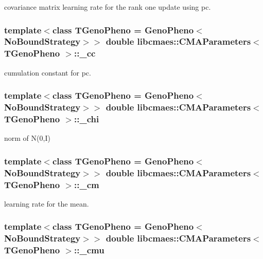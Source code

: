 covariance matrix learning rate for the rank one update using pc. \hypertarget{classlibcmaes_1_1CMAParameters_af85bfd2cef329712654fc697f50d5b4a}{
\subsubsection[{\-\_\-cc}]{\setlength{\rightskip}{0pt plus 5cm}template$<$class T\-Geno\-Pheno = Geno\-Pheno$<$\-No\-Bound\-Strategy$>$$>$ double {\bf libcmaes\-::\-C\-M\-A\-Parameters}$<$ T\-Geno\-Pheno $>$\-::\-\_\-cc}}\label{classlibcmaes_1_1CMAParameters_af85bfd2cef329712654fc697f50d5b4a}
cumulation constant for pc. \hypertarget{classlibcmaes_1_1CMAParameters_ab63f8f5d707242ec981945df88a573db}{
\subsubsection[{\-\_\-chi}]{\setlength{\rightskip}{0pt plus 5cm}template$<$class T\-Geno\-Pheno = Geno\-Pheno$<$\-No\-Bound\-Strategy$>$$>$ double {\bf libcmaes\-::\-C\-M\-A\-Parameters}$<$ T\-Geno\-Pheno $>$\-::\-\_\-chi}}\label{classlibcmaes_1_1CMAParameters_ab63f8f5d707242ec981945df88a573db}
norm of N(0,\-I) \hypertarget{classlibcmaes_1_1CMAParameters_a34e3414332daf15d81b353c7de803e1d}{
\subsubsection[{\-\_\-cm}]{\setlength{\rightskip}{0pt plus 5cm}template$<$class T\-Geno\-Pheno = Geno\-Pheno$<$\-No\-Bound\-Strategy$>$$>$ double {\bf libcmaes\-::\-C\-M\-A\-Parameters}$<$ T\-Geno\-Pheno $>$\-::\-\_\-cm}}\label{classlibcmaes_1_1CMAParameters_a34e3414332daf15d81b353c7de803e1d}
learning rate for the mean. \hypertarget{classlibcmaes_1_1CMAParameters_a0d4da3faa7fba9eb555d7dbfee7a6402}{
\subsubsection[{\-\_\-cmu}]{\setlength{\rightskip}{0pt plus 5cm}template$<$class T\-Geno\-Pheno = Geno\-Pheno$<$\-No\-Bound\-Strategy$>$$>$ double {\bf libcmaes\-::\-C\-M\-A\-Parameters}$<$ T\-Geno\-Pheno $>$\-::\-\_\-cmu}}\label{classlibcmaes_1_1CMAParameters_a0d4da3faa7fba9eb555d7dbfee7a6402}
